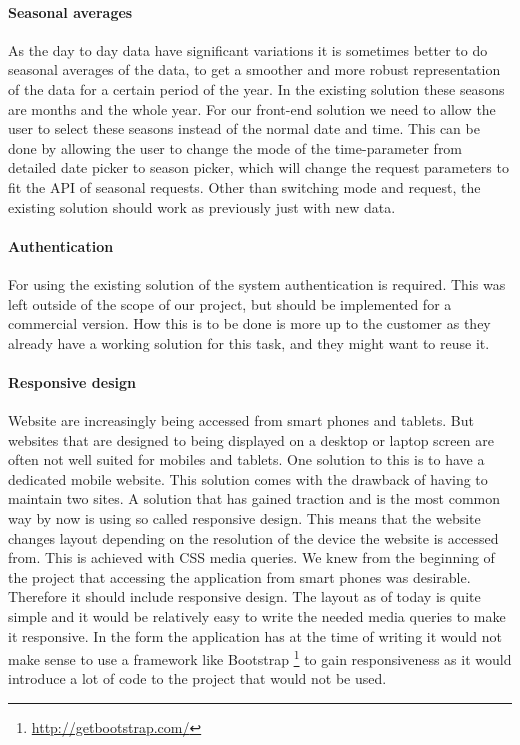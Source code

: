 \documentclass[11pt,a4paper,titlepage,oneside]{report}
\begin{document}
\paragraph{Seasonal averages}
As the day to day data have significant variations it is sometimes better to do seasonal averages of the data, to get a smoother and more robust representation of the data for a certain period of the year. In the existing solution these seasons are months and the whole year. For our \gls{front-end} solution we need to allow the user to select these seasons instead of the normal date and time. This can be done by allowing the user to change the mode of the time-parameter from detailed date picker to season picker, which will change the request parameters to fit the API of seasonal requests. Other than switching mode and request, the existing solution should work as previously just with new data.

\paragraph{Authentication}
For using the existing solution of the system authentication is required. This was left outside of the scope of our project, but should be implemented for a commercial version. How this is to be done is more up to the customer as they already have a working solution for this task, and they might want to reuse it.

\paragraph{Responsive design}
Website are increasingly being accessed from smart phones and tablets. But websites that are designed to being displayed on a desktop or laptop screen are often not well suited for mobiles and tablets. One solution to this is to have a dedicated mobile website. This solution comes with the drawback of having to maintain two sites. A solution that has gained traction and is the most common way by now is using so called responsive design. This means that the website changes layout depending on the resolution of the device the website is accessed from. This is achieved with \gls{CSS} media queries.
We knew from the beginning of the project that accessing the application from smart phones was desirable. Therefore it should include responsive design. The layout as of today is quite simple and it would be relatively easy to write the needed media queries to make it responsive. In the form the application has at the time of writing it would not make sense to use a framework like Bootstrap \footnote{\url{http://getbootstrap.com/}} to gain responsiveness as it would introduce a lot of code to the project that would not be used. 
\end{document}
